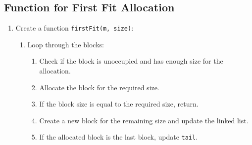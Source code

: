 \subsection{Function for First Fit Allocation}
\begin{enumerate}[label=\arabic*.,left=0pt]
  \item Create a function \texttt{firstFit(m, size)}:
        \begin{enumerate}[label=2.\arabic*.,left=0pt]
          \item Loop through the blocks:
                \begin{enumerate}[label=2.2.\arabic*.,left=0pt]
                  \item Check if the block is unoccupied and has enough size for the allocation.
                  \item Allocate the block for the required size.
                  \item If the block size is equal to the required size, return.
                  \item Create a new block for the remaining size and update the linked list.
                  \item If the allocated block is the last block, update \texttt{tail}.
                \end{enumerate}
        \end{enumerate}
\end{enumerate}

